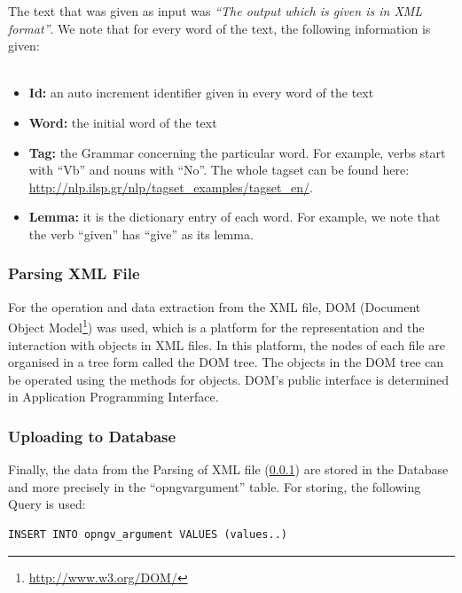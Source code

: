 The text that was given as input was \textit{``The output which is given is in XML format''}. We note that for every word of the text, the following information is given:\\
\\
\begin{itemize}
	
	\item \textbf{Id:} an auto increment identifier given in every word of the text
	\item \textbf{Word:} the initial word of the text
	\item \textbf{Tag:} the Grammar concerning the particular word. For example, verbs start with ``Vb'' and nouns with ``No''. The whole tagset can be found here:\\ \url{http://nlp.ilsp.gr/nlp/tagset_examples/tagset_en/}.
	\item \textbf{Lemma:} it is the dictionary entry of each word. For example, we note that the verb ``given'' has ``give'' as its lemma.

\end{itemize}

\subsubsection{Parsing XML File}\label{3223_ref}
For the operation and data extraction from the XML file, DOM (Document Object Model\footnote{\url{http://www.w3.org/DOM/}}) was used, which is a platform for the representation and the interaction with objects in XML files. In this platform, the nodes of each file are organised in a tree form called the DOM tree. The objects in the DOM tree can be operated using the methods for objects. DOM's public interface is determined in Application Programming Interface.

\subsubsection{Uploading to Database}\label{3224_ref}
Finally, the data from the Parsing of XML file (\ref{3223_ref}) are stored in the Database and more precisely in the ``opngv\textunderscore argument'' table. For storing, the following Query is used:\\
\lstset{language=SQL}
\begin{lstlisting}[frame=single, basicstyle=\small]
INSERT INTO opngv_argument VALUES (values..)
\end{lstlisting}


